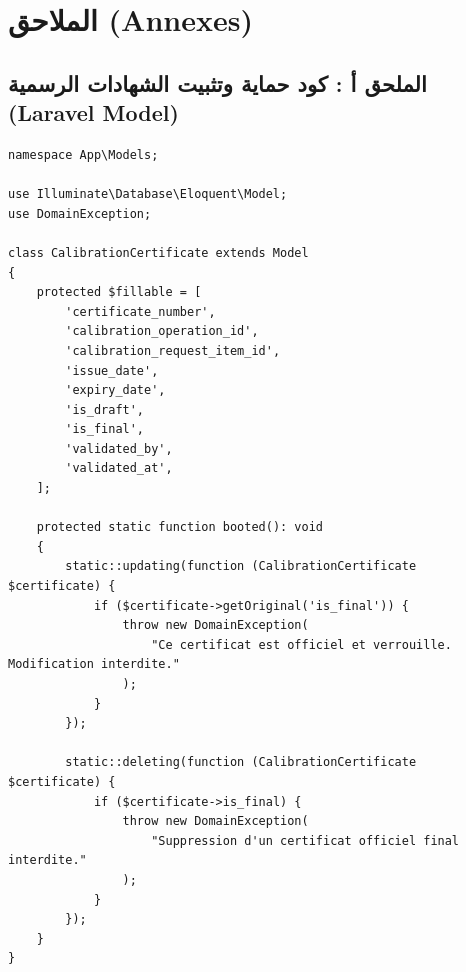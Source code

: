 \documentclass{bts-report-ar}
\begin{document}
\appendix
\chapter*{الملاحق (Annexes)}

\section*{الملحق أ : كود حماية وتثبيت الشهادات الرسمية (Laravel Model)}
\begin{LTR}
\begin{verbatim}
namespace App\Models;

use Illuminate\Database\Eloquent\Model;
use DomainException;

class CalibrationCertificate extends Model
{
    protected $fillable = [
        'certificate_number',
        'calibration_operation_id',
        'calibration_request_item_id',
        'issue_date',
        'expiry_date',
        'is_draft',
        'is_final',
        'validated_by',
        'validated_at',
    ];

    protected static function booted(): void
    {
        static::updating(function (CalibrationCertificate $certificate) {
            if ($certificate->getOriginal('is_final')) {
                throw new DomainException(
                    "Ce certificat est officiel et verrouille. Modification interdite."
                );
            }
        });

        static::deleting(function (CalibrationCertificate $certificate) {
            if ($certificate->is_final) {
                throw new DomainException(
                    "Suppression d'un certificat officiel final interdite."
                );
            }
        });
    }
}
\end{verbatim}
\end{LTR}
\end{document}
